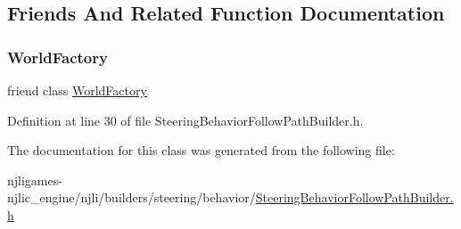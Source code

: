 \subsection{Friends And Related Function Documentation}
\mbox{\label{classnjli_1_1_steering_behavior_follow_path_builder_acb96ebb09abe8f2a37a915a842babfac}} 
\subsubsection{\texorpdfstring{World\+Factory}{WorldFactory}}
{\footnotesize\ttfamily friend class \mbox{\hyperlink{classnjli_1_1_world_factory}{World\+Factory}}\hspace{0.3cm}{\ttfamily [friend]}}



Definition at line 30 of file Steering\+Behavior\+Follow\+Path\+Builder.\+h.



The documentation for this class was generated from the following file\+:\begin{DoxyCompactItemize}
\item 
njligames-\/njlic\+\_\+engine/njli/builders/steering/behavior/\mbox{\hyperlink{_steering_behavior_follow_path_builder_8h}{Steering\+Behavior\+Follow\+Path\+Builder.\+h}}\end{DoxyCompactItemize}
